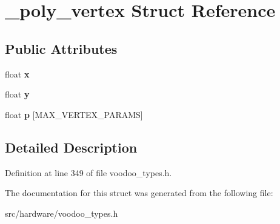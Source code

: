 \hypertarget{struct__poly__vertex}{\section{\-\_\-poly\-\_\-vertex Struct Reference}
\label{struct__poly__vertex}
}
\subsection*{Public Attributes}
\begin{DoxyCompactItemize}
\item 
\hypertarget{struct__poly__vertex_a79d1b9f7c3c483ac7151ba71bf167742}{float {\bfseries x}}\label{struct__poly__vertex_a79d1b9f7c3c483ac7151ba71bf167742}

\item 
\hypertarget{struct__poly__vertex_ab155c82fd034de40f0338d4bbac24f88}{float {\bfseries y}}\label{struct__poly__vertex_ab155c82fd034de40f0338d4bbac24f88}

\item 
\hypertarget{struct__poly__vertex_ac1bbba54729c29fdce4b03c56f7c7ac5}{float {\bfseries p} \mbox{[}M\-A\-X\-\_\-\-V\-E\-R\-T\-E\-X\-\_\-\-P\-A\-R\-A\-M\-S\mbox{]}}\label{struct__poly__vertex_ac1bbba54729c29fdce4b03c56f7c7ac5}

\end{DoxyCompactItemize}


\subsection{Detailed Description}


Definition at line 349 of file voodoo\-\_\-types.\-h.



The documentation for this struct was generated from the following file\-:\begin{DoxyCompactItemize}
\item 
src/hardware/voodoo\-\_\-types.\-h\end{DoxyCompactItemize}
